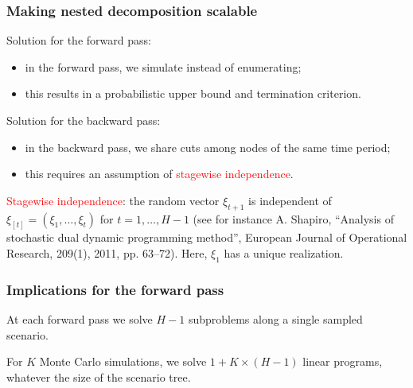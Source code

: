 \documentclass[aspectratio=169]{beamer}
\begin{document}
\begin{frame}
\frametitle{Making nested decomposition scalable}

Solution for the forward pass:
\begin{itemize}
	\item
in the forward pass, we simulate instead of enumerating;
	\item
this results in a probabilistic upper bound and termination
criterion.
\end{itemize}

\mbox{}

Solution for the backward pass:
\begin{itemize}
	\item
in the backward pass, we share cuts among nodes of the
same time period;
\item
this requires an assumption of \textcolor{red}{stagewise independence}.
\end{itemize}

\mbox{}

{\small \textcolor{red}{Stagewise independence}: the random vector $\xi_{t+1}$ is independent of $\xi_{[t]} = (\xi_1,\ldots, \xi_t)$ for $t = 1,\ldots, H-1$ (see for instance A. Shapiro, ``Analysis of stochastic dual dynamic programming method'', European Journal of Operational Research, 209(1), 2011, pp. 63--72). Here, $\xi_1$ has a unique realization.}

\end{frame}

\begin{frame}
	\frametitle{Implications for the forward pass}

At each forward pass we solve $H-1$ subproblems along a single sampled scenario.

\begin{center}
\end{center}

For $K$ Monte Carlo simulations, we solve $1 + K\times (H-1)$ linear
programs, whatever the size of the scenario tree.

\end{frame}
\end{document}
